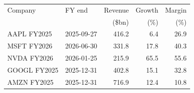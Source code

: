 \begin{tabular}{@{}llrrr@{}}
\toprule
Company & FY end & Revenue & Growth & Margin \\
 & & (\$bn) & (\%) & (\%) \\
\midrule
AAPL FY2025 & 2025-09-27 & 416.2 & 6.4 & 26.9 \\
MSFT FY2026 & 2026-06-30 & 331.8 & 17.8 & 40.3 \\
NVDA FY2026 & 2026-01-25 & 215.9 & 65.5 & 55.6 \\
GOOGL FY2025 & 2025-12-31 & 402.8 & 15.1 & 32.8 \\
AMZN FY2025 & 2025-12-31 & 716.9 & 12.4 & 10.8 \\
\bottomrule
\end{tabular}
